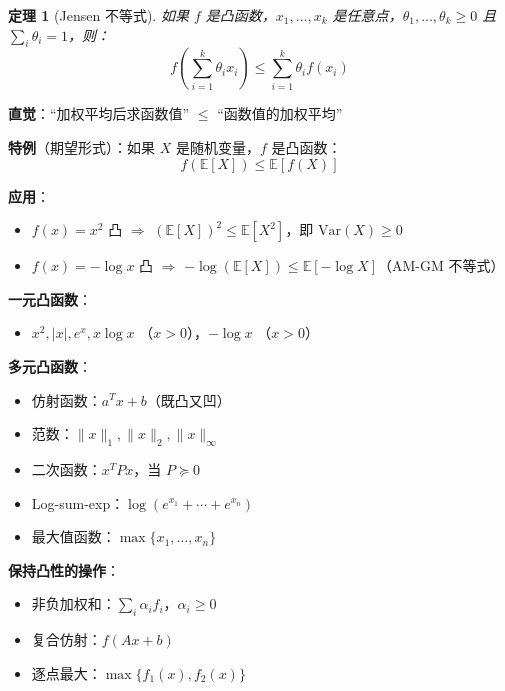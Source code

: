 \documentclass[12pt, a4paper]{ctexart}
\newtheorem{theorem}{定理}[section]
\begin{document}
\begin{blackboard}

\begin{theorem}[Jensen 不等式]
如果 $f$ 是凸函数，$x_1, \ldots, x_k$ 是任意点，$\theta_1, \ldots, \theta_k \geq 0$ 且 $\sum_i \theta_i = 1$，则：
\[
f\left(\sum_{i=1}^k \theta_i x_i\right) \leq \sum_{i=1}^k \theta_i f(x_i)
\]
\end{theorem}

\textbf{直觉}：``加权平均后求函数值'' $\leq$ ``函数值的加权平均''

\textbf{特例}（期望形式）：如果 $X$ 是随机变量，$f$ 是凸函数：
\[
f(\mathbb{E}[X]) \leq \mathbb{E}[f(X)]
\]

\textbf{应用}：
\begin{itemize}
    \item $f(x) = x^2$ 凸 $\Rightarrow$ $(\mathbb{E}[X])^2 \leq \mathbb{E}[X^2]$，即 $\text{Var}(X) \geq 0$
    \item $f(x) = -\log x$ 凸 $\Rightarrow$ $-\log(\mathbb{E}[X]) \leq \mathbb{E}[-\log X]$（AM-GM 不等式）
\end{itemize}

\end{blackboard}

\begin{blackboard}[常见的凸函数]

\textbf{一元凸函数}：
\begin{itemize}
    \item $x^2, |x|, e^x, x \log x$ （$x > 0$），$-\log x$ （$x > 0$）
\end{itemize}

\textbf{多元凸函数}：
\begin{itemize}
    \item 仿射函数：$a^T x + b$（既凸又凹）
    \item 范数：$\|x\|_1, \|x\|_2, \|x\|_\infty$
    \item 二次函数：$x^T P x$，当 $P \succeq 0$
    \item Log-sum-exp：$\log(e^{x_1} + \cdots + e^{x_n})$
    \item 最大值函数：$\max\{x_1, \ldots, x_n\}$
\end{itemize}

\textbf{保持凸性的操作}：
\begin{itemize}
    \item 非负加权和：$\sum_i \alpha_i f_i$，$\alpha_i \geq 0$
    \item 复合仿射：$f(Ax + b)$
    \item 逐点最大：$\max\{f_1(x), f_2(x)\}$
\end{itemize}

\end{blackboard}
\end{document}
